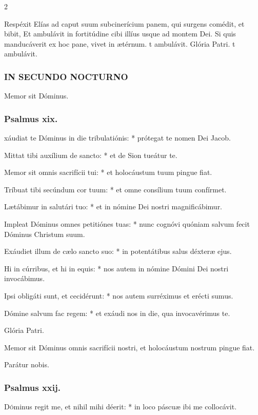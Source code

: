 \documentclass[9pt,twoside]{extarticle}
\begin{document}
\begin{multicols}{2}
\begin{tightlist}{}
\item {} Respéxit Elías ad caput suum subcinerícium panem, qui surgens comédit, et bibit, \textred{*} Et ambulávit in fortitúdine cibi illíus usque ad montem Dei.  Si quis manducáverit ex hoc pane, vivet in ætérnum. t ambulávit. Glória Patri. t ambulávit.
\end{tightlist}

\subsubsection*{\center \textsc{IN SECUNDO NOCTURNO}}
 Memor sit Dóminus.
\subsubsection*{\center Psalmus xix.}
xáudiat te Dóminus in die tribulatiónis: * prótegat te nomen Dei Jacob.

Mittat tibi auxílium de sancto: * et de Sion tueátur te.

Memor sit omnis sacrifícii tui: * et holocáustum tuum pingue fiat.

Tríbuat tibi secúndum cor tuum: * et omne consílium tuum confírmet.

Lætábimur in salutári tuo: * et in nómine Dei nostri magnificábimur.

Impleat Dóminus omnes petitiónes tuas: * nunc cognóvi quóniam salvum fecit Dóminus Christum suum.

Exáudiet illum de cælo sancto suo: * in potentátibus salus déxteræ ejus.

Hi in cúrribus, et hi in equis: * nos autem in nómine Dómini Dei nostri invocábimus.

Ipsi obligáti sunt, et cecidérunt: * nos autem surréximus et erécti sumus.

Dómine salvum fac regem: * et exáudi nos in die, qua invocavérimus te.

Glória Patri.

\begin{tightlist}{}
\item {} Memor sit Dóminus omnis sacrifícii nostri, et holocáustum nostrum pingue fiat.
\item {} Parátur nobis.
\end{tightlist}

\subsubsection*{\center Psalmus xxij.}
\lettrine{D}óminus regit me, et nihil mihi déerit: * in loco páscuæ ibi me collocávit.


\end{multicols}
\end{document}
